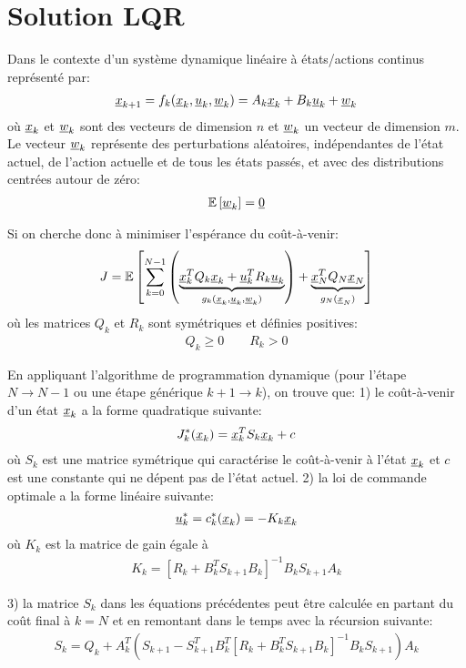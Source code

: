 \newpage
\section{Solution LQR}

Dans le contexte d'un système dynamique linéaire à états/actions continus représenté par:
\begin{align}
    \underline{x}_{k+1} = f_k(\underline{x}_k , \underline{u}_k , \underline{w}_k )  = A_k \underline{x}_k + B_k \underline{u}_k + \underline{w}_k
\end{align}
où $\underline{x}_k$ et $\underline{w}_k$ sont des vecteurs de dimension $n$ et $\underline{w}_k$ un vecteur de dimension $m$. Le vecteur $\underline{w}_k$ représente des perturbations aléatoires, indépendantes de l'état actuel, de l'action actuelle et de tous les états passés, et avec des distributions centrées autour de zéro: 
\begin{align}
    \e{\col{w}_k} = \col{0} %
\end{align}

Si on cherche donc à minimiser l'espérance du coût-à-venir:
\begin{align}
    J = {\mathbb E}\left[  \sum_{k=0}^{N-1} 
    \left(
    \underbrace{
    \underline{x}_k^T Q_k \underline{x}_k + \underline{u}_k^T R_k \underline{u}_k
    }_{ g_k( \underline{x}_k, \underline{u}_k , \underline{w}_k ) }
    \right)
    +
    \underbrace{
    \underline{x}_N^T Q_N \underline{x}_N
    }_{ g_N( \underline{x}_N )  }
     \right]
\end{align}
où les matrices $Q_k$ et $R_k$ sont symétriques et définies positives:
\begin{align}
    Q_k \geq 0 \quad \quad R_k > 0 
\end{align}

En appliquant l'algorithme de programmation dynamique (pour l'étape $N\rightarrow N-1$ ou une étape générique $k+1 \rightarrow k$), on trouve que:
1) le coût-à-venir d'un état $\underline{x}_k$ a la forme quadratique suivante:
\begin{align}
    J_k^*( \underline{x}_k ) = \underline{x}_k^T S_k \underline{x}_k + c
\end{align}
où $S_k$ est une matrice symétrique qui caractérise le coût-à-venir à l'état $\underline{x}_k$ et $c$ est une constante qui ne dépent pas de l'état actuel.
2) la loi de commande optimale a la forme linéaire suivante:
\begin{align}
    \underline{u}_k^* = c_k^*( \underline{x}_k ) = - K_k \underline{x}_k
\end{align}
où $K_k$ est la matrice de gain égale à
\begin{align}
    K_k = \left[ R_k + B_k^T S_{k+1} B_k \right]^{-1} B_k S_{k+1} A_k
\end{align}

3) la matrice $S_k$ dans les équations précédentes peut être calculée en partant du coût final à $k=N$ et en remontant dans le temps avec la récursion suivante:
\begin{align}
    S_k = Q_k + A_k^T \left( S_{k+1} - S_{k+1}^T B_k^T  \left[ R_k + B_k^T S_{k+1} B_k \right]^{-1} B_k S_{k+1} \right) A_k
\end{align}

